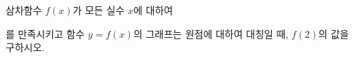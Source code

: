 삼차함수 $f(x)$가 모든 실수 $x$에 대하여\par\smallskip{}\par\smallskip\noindent 를 만족시키고 함수 $y=f(x)$의 그래프는 원점에 대하여 대칭일 때, $f(2)$의 값을 구하시오.
